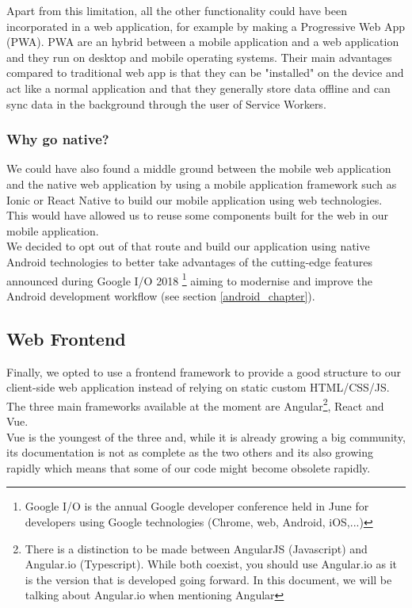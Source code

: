 \documentclass[11pt,a4paper]{report}
\begin{document}
Apart from this limitation, all the other functionality could have been incorporated in a web application, for example by making a Progressive Web App (PWA). PWA are an hybrid between a mobile application and a web application and they run on desktop and mobile operating systems. Their main advantages compared to traditional web app is that they can be "installed" on the device and act like a normal application and that they generally store data offline and can sync data in the background through the user of Service Workers.
\subsubsection{Why go native?}
We could have also found a middle ground between the mobile web application and the native web application by using a mobile application framework such as Ionic or React Native to build our mobile application using web technologies. This would have allowed us to reuse some components built for the web in our mobile application.\\

We decided to opt out of that route and build our application using native Android technologies to better take advantages of the cutting-edge features announced during Google I/O 2018 \footnote{Google I/O is the annual Google developer conference held in June for developers using Google technologies (Chrome, web, Android, iOS,...)} aiming to modernise and improve the Android development workflow (see section \ref{android_chapter}).
\subsection{Web Frontend}
Finally, we opted to use a frontend framework to provide a good structure to our client-side web application instead of relying on static custom HTML/CSS/JS.\\

The three main frameworks available at the moment are Angular\footnote{There is a distinction to be made between AngularJS (Javascript) and Angular.io (Typescript). While both coexist, you should use Angular.io as it is the version that is developed going forward. In this document, we will be talking about Angular.io when mentioning Angular}, React and Vue. \\

Vue is the youngest of the three and, while it is already growing a big community, its documentation is not as complete as the two others and its also growing rapidly which means that some of our code might become obsolete rapidly. \\
\end{document}
